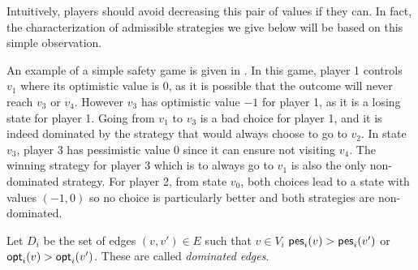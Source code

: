 Intuitively, players should avoid decreasing this pair of values if they can.
In fact, the characterization of admissible strategies we give below will be based on this
simple observation.

\begin{example}
  An example of a simple safety game is given in .
  In this game, player 1 controls $v_1$ where its optimistic
  value is $0$, as it is possible that the outcome will never reach
  $v_3$ or $v_4$.
  However $v_3$ has optimistic value $-1$ for player 1, as it is a losing
  state for player 1.
  Going from $v_1$ to $v_3$ is a bad choice for player 1, and
  it is indeed dominated by the strategy that would always choose to go
  to $v_2$.
  In state $v_3$, player 3 has pessimistic value $0$ since it can ensure not
  visiting $v_4$.
  The winning strategy for player 3 which is to always go to $v_1$ is also
  the only non-dominated strategy.
  For player 2, from state $v_0$, both choices lead to a state with values
  $(-1, 0)$ so no choice is particularly better and both strategies are
  non-dominated.
\end{example}

\begin{definition} Let \(D_i\) be the set of edges
\((v,v') \in E\) such that \(v \in V_i\) %
\(\textsf{pes}_i(v) > \textsf{pes}_i(v')\) or \(\textsf{opt}_i(v) > \textsf{opt}_i(v')\). These
are called \emph{dominated edges}.
\end{definition}

